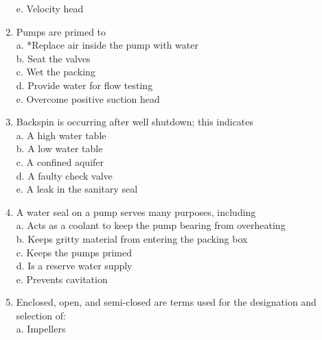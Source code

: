 \begin{enumerate}[1.]
e. Velocity head\\

\item Pumps are primed to\\

a. *Replace air inside the pump with water\\

b. Seat the valves\\

c. Wet the packing\\

d. Provide water for flow testing\\

e. Overcome positive suction head\\

\item Backspin is occurring after well shutdown; this indicates\\

a. A high water table\\

b. A low water table\\

c. A confined aquifer\\

d. A faulty check valve\\

e. A leak in the sanitary seal\\

  
  
\item A water seal on a pump serves many purposes, including\\

a. Acts as a coolant to keep the pump bearing from overheating\\

b. Keeps gritty material from entering the packing box\\

c. Keeps the pumps primed\\

d. Is a reserve water supply\\

e. Prevents cavitation\\

\item Enclosed, open, and semi-closed are terms used for the designation and selection of:\\

a. Impellers\\


\end{enumerate}
